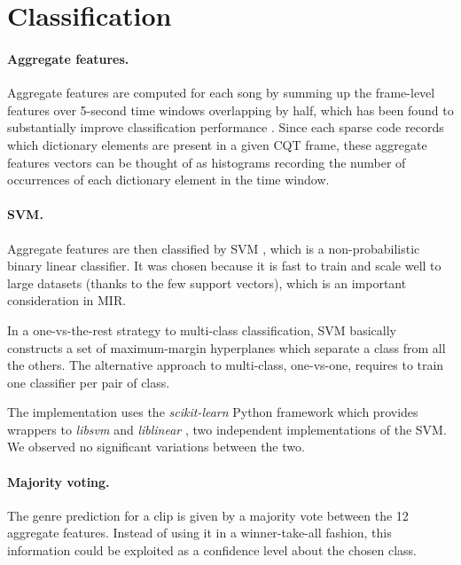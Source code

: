 \section{Classification}

\paragraph{Aggregate features.}
Aggregate features are computed for each song by summing up the frame-level features over 5-second time windows overlapping by half, which has been found to substantially improve classification performance \cite{bergstra2006aggregateFeatures, hamel2010aggregateFeatures}. Since each sparse code records which dictionary elements are present in a given \gls{CQT} frame, these aggregate features vectors can be thought of as histograms recording the number of occurrences of each dictionary element in the time window.

\paragraph{\gls{SVM}.}
Aggregate features are then classified by \gls{SVM} \cite{cortes1995SVM}, which is a non-probabilistic binary linear classifier. It was chosen because it is fast to train and scale well to large datasets (thanks to the few support vectors), which is an important consideration in \gls{MIR}.

In a one-vs-the-rest strategy to multi-class classification, \gls{SVM} basically constructs a set of maximum-margin hyperplanes which separate a class from all the others. The alternative approach to multi-class, one-vs-one, requires to train one classifier per pair of class.

The implementation uses the \textit{scikit-learn} Python framework \cite{sklearn} which provides wrappers to \textit{libsvm} \cite{libsvm} and \textit{liblinear} \cite{liblinear}, two independent implementations of the \gls{SVM}. We observed no significant variations between the two.

\paragraph{Majority voting.}
The genre prediction for a clip is given by a majority vote between the 12 aggregate features. Instead of using it in a winner-take-all fashion, this information could be exploited as a confidence level about the chosen class.


